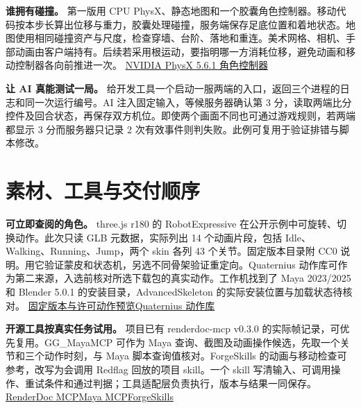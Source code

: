 \documentclass[UTF8,11pt,fontset=fandol,a4paper]{ctexart}
\newcommand{\src}[2]{\href{#1}{#2}}
\newcommand{\pg}[1]{\clearpage\section{#1}}
\begin{document}
\textbf{谁拥有碰撞。} 第一版用 CPU PhysX、静态地图和一个胶囊角色控制器。移动代码按本步长算出位移与重力，胶囊处理碰撞，服务端保存足底位置和着地状态。地图使用相同碰撞资产与尺度，检查穿墙、台阶、落地和重连。美术网格、相机、手部动画由客户端持有。后续若采用根运动，要指明哪一方消耗位移，避免动画和移动控制器各向前推进一次。 \src{https://nvidia-omniverse.github.io/PhysX/physx/5.6.1/docs/CharacterControllers.html}{NVIDIA PhysX 5.6.1 角色控制器}

\textbf{让 AI 真能测试一局。} 给开发工具一个启动一服两端的入口，返回三个进程的日志和同一次运行编号。AI 注入固定输入，等候服务器确认第 3 分，读取两端比分控件及回合状态，再保存双方机位。即使两个画面不同也可通过游戏规则，若两端都显示 3 分而服务器只记录 2 次有效事件则判失败。此例可复用于验证排错与脚本修改。

\pg{素材、工具与交付顺序}
\textbf{可立即查阅的角色。} three.js r180 的 RobotExpressive 在公开示例中可旋转、切换动作。此次只读 GLB 元数据，实际列出 14 个动画片段，包括 Idle、Walking、Running、Jump，两个 skin 各列 43 个关节。固定版本目录附 CC0 说明。用它验证蒙皮和状态机，另选不同骨架验证重定向。Quaternius 动作库可作为第二来源，入选前核对所选下载包的真实动作。工作机找到了 Maya 2023/2025 和 Blender 5.0.1 的安装目录，AdvancedSkeleton 的实际安装位置与加载状态待核对。 \src{https://github.com/mrdoob/three.js/tree/r180/examples/models/gltf/RobotExpressive}{固定版本与许可}\quad \src{https://threejs.org/examples/webgl_animation_skinning_morph.html}{动作预览}\quad \src{https://quaternius.com/packs/universalanimationlibrary.html}{Quaternius 动作库}

\textbf{开源工具按真实任务试用。} 项目已有 renderdoc-mcp v0.3.0 的实际帧记录，可优先复用。GG\_MayaMCP 可作为 Maya 查询、截图及动画操作候选，先取一个关节和三个动作时刻，与 Maya 脚本查询值核对。ForgeSkills 的动画与移动检查可参考，改写为会调用 Redflag 回放的项目 skill。一个 skill 写清输入、可调用操作、重试条件和通过判据；工具适配层负责执行，版本与结果一同保存。 \src{https://github.com/JiaboLi-GitHub/renderdoc-mcp/releases/tag/v0.3.0}{RenderDoc MCP}\quad \src{https://github.com/GimbalGoats/GG_MayaMCP}{Maya MCP}\quad \src{https://github.com/sekaikx/ForgeSkills}{ForgeSkills}
\end{document}
